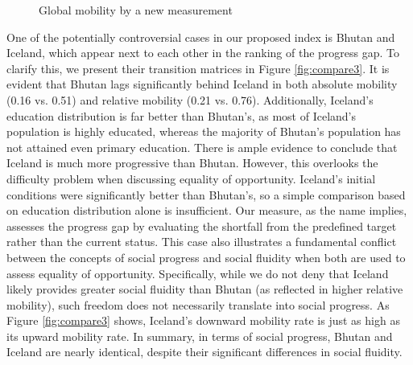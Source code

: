 \begin{figure}[H]
    \centering
    \caption{Global mobility by a new measurement}
    \label{fig:map}
\end{figure}

One of the potentially controversial cases in our proposed index is Bhutan and Iceland, which appear next to each other in the ranking of the progress gap. To clarify this, we present their transition matrices in Figure \ref{fig:compare3}. It is evident that Bhutan lags significantly behind Iceland in both absolute mobility (0.16 vs. 0.51) and relative mobility (0.21 vs. 0.76). Additionally, Iceland's education distribution is far better than Bhutan’s, as most of Iceland’s population is highly educated, whereas the majority of Bhutan’s population has not attained even primary education. There is ample evidence to conclude that Iceland is much more progressive than Bhutan. However, this overlooks the difficulty problem when discussing equality of opportunity. Iceland’s initial conditions were significantly better than Bhutan’s, so a simple comparison based on education distribution alone is insufficient. Our measure, as the name implies, assesses the progress gap by evaluating the shortfall from the predefined target rather than the current status.  This case also illustrates a fundamental conflict between the concepts of social progress and social fluidity when both are used to assess equality of opportunity. Specifically, while we do not deny that Iceland likely provides greater social fluidity than Bhutan (as reflected in higher relative mobility), such freedom does not necessarily translate into social progress. As Figure \ref{fig:compare3} shows, Iceland’s downward mobility rate is just as high as its upward mobility rate. In summary, in terms of social progress, Bhutan and Iceland are nearly identical, despite their significant differences in social fluidity.


